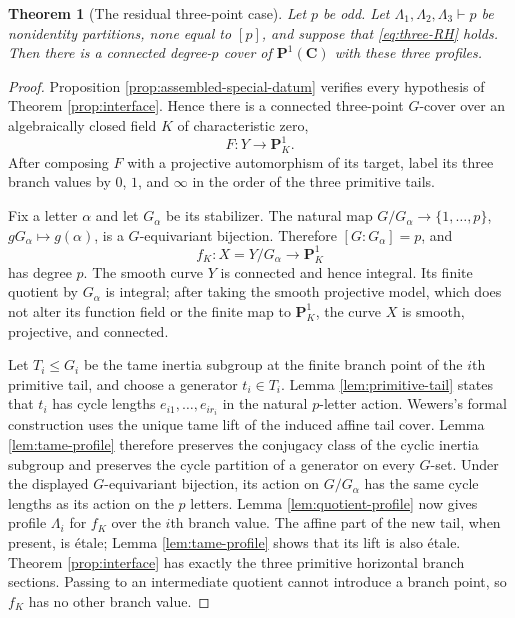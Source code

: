 \documentclass[11pt]{amsart}
\theoremstyle{plain}
\newtheorem{theorem}{Theorem}[section]
\theoremstyle{definition}
\numberwithin{equation}{section}
\begin{document}
\begin{theorem}[The residual three-point case]\label{thm:residual}
Let $p$ be odd.  Let $\Lambda_1,\Lambda_2,\Lambda_3\vdash p$ be nonidentity
partitions, none equal to $[p]$, and suppose that
\eqref{eq:three-RH} holds.  Then there is a connected degree-$p$ cover of
$\mathbf P^1(\mathbf C)$ with these three profiles.
\end{theorem}

\begin{proof}
Proposition \ref{prop:assembled-special-datum} verifies every hypothesis of
Theorem \ref{prop:interface}.  Hence there is a connected three-point
$G$-cover over an algebraically closed field $K$ of characteristic zero,
\[
 F:Y\longrightarrow\mathbf P^1_K.
\]
After composing $F$ with a projective automorphism of its target, label its
three branch values by $0$, $1$, and $\infty$ in the order of the three
primitive tails.

Fix a letter $\alpha$ and let $G_\alpha$ be its stabilizer.  The natural map
$G/G_\alpha\to\{1,\ldots,p\}$, $gG_\alpha\mapsto g(\alpha)$, is a
$G$-equivariant bijection.  Therefore $[G:G_\alpha]=p$, and
\[
 f_K:X=Y/G_\alpha\longrightarrow\mathbf P^1_K
\]
has degree $p$.  The smooth curve $Y$ is connected and hence integral.  Its
finite quotient by $G_\alpha$ is integral; after taking the smooth projective
model, which does not alter its function field or the finite map to
$\mathbf P^1_K$, the curve $X$ is smooth, projective, and connected.

Let $T_i\leq G_i$ be the tame inertia subgroup at the finite branch point
of the $i$th primitive tail, and choose a generator $t_i\in T_i$.  Lemma
\ref{lem:primitive-tail} states that $t_i$ has cycle lengths
$e_{i1},\ldots,e_{ir_i}$ in the natural $p$-letter action.  Wewers's formal
construction uses the unique tame lift of the induced affine tail cover.
Lemma \ref{lem:tame-profile} therefore preserves the conjugacy class of the
cyclic inertia subgroup and preserves the cycle partition of a generator
on every $G$-set.  Under the displayed $G$-equivariant bijection, its action
on $G/G_\alpha$ has the same cycle lengths as its action on the $p$ letters.
Lemma \ref{lem:quotient-profile} now gives profile $\Lambda_i$ for $f_K$
over the $i$th branch value.  The affine part of the new tail, when present,
is \'etale; Lemma \ref{lem:tame-profile} shows that its lift is also \'etale.
Theorem \ref{prop:interface} has exactly the three primitive horizontal
branch sections.  Passing to an intermediate quotient cannot introduce a
branch point, so $f_K$ has no other branch value.


\end{proof}
\end{document}
